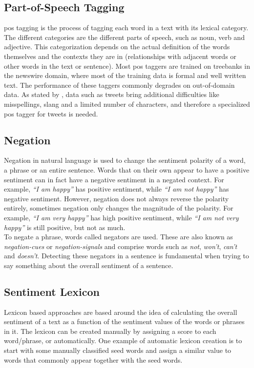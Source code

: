 \subsection*{Part-of-Speech Tagging}
\ac{pos} tagging is the process of tagging each word in a text with its lexical category. The different categories are the different parts of speech, such as noun, verb and adjective. This categorization depends on the actual definition of the words themselves and the contexts they are in (relationships with adjacent words or other words in the text or sentence). Most \ac{pos} taggers are trained on treebanks in the newswire domain, where most of the training data is formal and well written text. The performance of these taggers commonly degrades on out-of-domain data. As stated by \cite{Gimpel11}, data such as tweets bring additional difficulties like misspellings, slang and a limited number of characters, and therefore a specialized \ac{pos} tagger for tweets is needed. 

\subsection*{Negation}
Negation in natural language is used to change the sentiment polarity of a word, a phrase or an entire sentence. Words that on their own appear to have a positive sentiment can in fact have a negative sentiment in a negated context. For example, \textit{``I am happy''} has positive sentiment, while \textit{``I am not happy''} has negative sentiment. However, negation does not always reverse the polarity entirely, sometimes negation only changes the magnitude of the polarity. For example, \textit{``I am very happy''} has high positive sentiment, while \textit{``I am not very happy''} is still positive, but not as much. \\

To negate a phrase, words called negators are used. These are also known as \textit{negation-cues} or \textit{negation-signals} and comprise words such as \textit{not}, \textit{won't}, \textit{can't} and \textit{doesn't}. Detecting these negators in a sentence is fundamental when trying to say something about the overall sentiment of a sentence. 

\subsection*{Sentiment Lexicon}
Lexicon based approaches are based around the idea of calculating the overall sentiment of a text as a function of the sentiment values of the words or phrases in it. The lexicon can be created manually by assigning a score to each word/phrase, or automatically. One example of automatic lexicon creation is to start with some manually classified seed words and assign a similar value to words that commonly appear together with the seed words.

